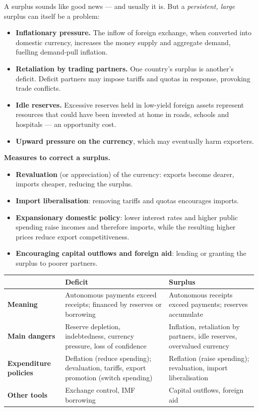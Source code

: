 \documentclass[11pt]{article}
\newcounter{popsec}
\newcounter{popsub}
\newcommand{\courssub}[1]{%
  \stepcounter{popsub}%
  \par\vspace{9pt}\noindent{\popxbold\fontsize{11.5}{13}\selectfont\color{popink}{\color{poporange}\thepopsec.\thepopsub}\hspace{6pt}#1}\par\nopagebreak\vspace{4pt}
}
\begin{document}
\courssub{The Balance of Payments Surplus}

A surplus sounds like good news --- and usually it is. But a \emph{persistent, large} surplus can itself be a problem:

\begin{itemize}
\item \textbf{Inflationary pressure.} The inflow of foreign exchange, when converted into domestic currency, increases the money supply and aggregate demand, fuelling demand-pull inflation.
\item \textbf{Retaliation by trading partners.} One country's surplus is another's deficit. Deficit partners may impose tariffs and quotas in response, provoking trade conflicts.
\item \textbf{Idle reserves.} Excessive reserves held in low-yield foreign assets represent resources that could have been invested at home in roads, schools and hospitals --- an opportunity cost.
\item \textbf{Upward pressure on the currency}, which may eventually harm exporters.
\end{itemize}

\textbf{Measures to correct a surplus.}\par
\begin{itemize}
\item \textbf{Revaluation} (or appreciation) of the currency: exports become dearer, imports cheaper, reducing the surplus.
\item \textbf{Import liberalisation}: removing tariffs and quotas encourages imports.
\item \textbf{Expansionary domestic policy}: lower interest rates and higher public spending raise incomes and therefore imports, while the resulting higher prices reduce export competitiveness.
\item \textbf{Encouraging capital outflows and foreign aid}: lending or granting the surplus to poorer partners.
\end{itemize}

\begin{center}
\begin{tabularx}{\linewidth}{|l|X|X|}
\hline
\rowcolor{popblueL} & \textbf{Deficit} & \textbf{Surplus} \\
\hline
\textbf{Meaning} & Autonomous payments exceed receipts; financed by reserves or borrowing & Autonomous receipts exceed payments; reserves accumulate \\
\hline
\textbf{Main dangers} & Reserve depletion, indebtedness, currency pressure, loss of confidence & Inflation, retaliation by partners, idle reserves, overvalued currency \\
\hline
\textbf{Expenditure policies} & Deflation (reduce spending); devaluation, tariffs, export promotion (switch spending) & Reflation (raise spending); revaluation, import liberalisation \\
\hline
\textbf{Other tools} & Exchange control, IMF borrowing & Capital outflows, foreign aid \\
\hline
\end{tabularx}
\end{center}
\end{document}
